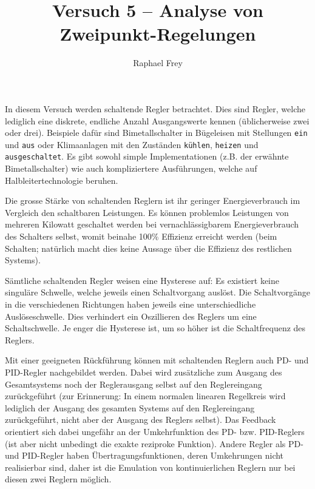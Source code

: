 \documentclass[a4paper,10pt]{article}
\title{Versuch 5 -- Analyse von Zweipunkt-Regelungen}
\author{Raphael Frey}
\affil{FHNW -- Hochschule f\"ur Technik\\ Studiengang EIT\\ Grundlagenlabor 4}
\def\code#1{\texttt{#1}}
\begin{document}
\maketitle

In  diesem  Versuch werden  schaltende  Regler  betrachtet. Dies sind  Regler,
welche  lediglich   eine  diskrete,   endliche  Anzahl   Ausgangswerte  kennen
(\"ublicherweise zwei  oder drei). Beispiele daf\"ur sind  Bimetallschalter in
B\"ugeleisen mit  Stellungen \code{ein}  und \code{aus} oder  Klimaanlagen mit
den  Zust\"anden \code{k\"uhlen},  \code{heizen} und  \code{ausgeschaltet}. Es
gibt sowohl simple Implementationen (z.B. der erw\"ahnte Bimetallschalter) wie
auch kompliziertere Ausf\"uhrungen, welche auf Halbleitertechnologie beruhen.

Die grosse St\"arke von schaltenden  Reglern ist ihr geringer Energieverbrauch
im Vergleich den schaltbaren Leistungen. Es k\"onnen problemlos Leistungen von
mehreren Kilowatt geschaltet  werden bei vernachl\"assigbarem Energieverbrauch
des  Schalters selbst,  womit beinahe  100\% Effizienz  erreicht werden  (beim
Schalten;  nat\"urlich  macht dies  keine  Aussage  \"uber die  Effizienz  des
restlichen Systems).

S\"amtliche  schaltenden  Regler  weisen   eine  Hysterese  auf: Es  existiert
keine  singul\"are Schwelle,  welche  jeweils  einen Schaltvorgang  ausl\"ost.
Die  Schaltvorg\"ange  in  die  verschiedenen Richtungen  haben  jeweils  eine
unterschiedliche  Ausl\"oseschwelle. Dies   verhindert  ein   Oszillieren  des
Reglers um eine Schaltschwelle. Je enger die  Hysterese ist, um so h\"oher ist
die Schaltfrequenz des Reglers.

Mit  einer   geeigneten  R\"uckf\"uhrung  k\"onnen  mit   schaltenden  Reglern
auch  PD-   und  PID-Regler  nachgebildet  werden. Dabei   wird  zus\"atzliche
zum   Ausgang   des   Gesamtsystems   noch  der   Reglerausgang   selbst   auf
den  Reglereingang   zur\"uckgef\"uhrt  (zur  Erinnerung: In   einem  normalen
linearen  Regelkreis   wird  lediglich   der  Ausgang  des   gesamten  Systems
auf  den   Reglereingang  zur\"uckgef\"uhrt,   nicht  aber  der   Ausgang  des
Reglers  selbst).   Das  Feedback  orientiert sich  dabei  ungef\"ahr  an  der
Umkehrfunktion  des  PD-  bzw. PID-Reglers   (ist  aber  nicht  unbedingt  die
exakte  reziproke  Funktion). Andere  Regler  als  PD-  und  PID-Regler  haben
\"Ubertragungsfunktionen, deren Umkehrungen nicht realisierbar sind, daher ist
die  Emulation  von  kontinuierlichen  Reglern nur  bei  diesen  zwei  Reglern
m\"oglich.
\end{document}
